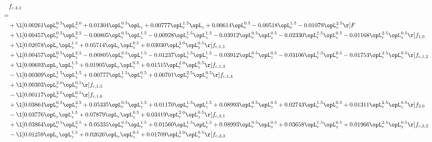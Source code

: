 \begin{alignat}{2} 
\label{eq:f_41_1} 
& f_{c,4,1} \nonumber \\ 
 = \\ 
& + \l[  0.00261 \opL_r^{0.5} \opL_z^{2.0} +  0.01304 \opL_r^{0.5} \opL_z +  0.00777 \opL_r^{1.5} \opL_z +  0.00614 \opL_r^{0.5}   -0.00518 \opL_r^{1.5}   -0.01079 \opL_r^{2.5}  \r] F \nonumber \\ 
& + \l[  0.00457 \opL_r^{0.5} \opL_z^{2.5}   -0.00805 \opL_r^{0.5} \opL_z^{1.5}   -0.00928 \opL_r^{1.5} \opL_z^{1.5}   -0.03912 \opL_r^{0.5} \opL_z^{0.5}   -0.02330 \opL_r^{1.5} \opL_z^{0.5}   -0.01168 \opL_r^{2.5} \opL_z^{0.5}  \r] f_{1,0} \nonumber \\ 
& + \l[  0.02078 \opL_r \opL_z^{1.5} +  0.05714 \opL_r \opL_z^{0.5} +  0.03030 \opL_r^{2.0} \opL_z^{0.5}  \r] f_{c,1,1} \nonumber \\ 
& + \l[  0.00457 \opL_r^{0.5} \opL_z^{2.5}   -0.00805 \opL_r^{0.5} \opL_z^{1.5}   -0.01237 \opL_r^{1.5} \opL_z^{1.5}   -0.03912 \opL_r^{0.5} \opL_z^{0.5}   -0.03106 \opL_r^{1.5} \opL_z^{0.5}   -0.01753 \opL_r^{2.5} \opL_z^{0.5}  \r] f_{c,1,2} \nonumber \\ 
& + \l[  0.00693 \opL_r \opL_z^{1.5} +  0.01905 \opL_r \opL_z^{0.5} +  0.01515 \opL_r^{2.0} \opL_z^{0.5}  \r] f_{c,1,3} \nonumber \\ 
& - \l[  0.00309 \opL_r^{1.5} \opL_z^{1.5} +  0.00777 \opL_r^{1.5} \opL_z^{0.5} +  0.00701 \opL_r^{2.5} \opL_z^{0.5}  \r] f_{c,1,4} \nonumber \\ 
& + \l[  0.00303 \opL_r^{2.0} \opL_z^{0.5}  \r] f_{c,1,5} \nonumber \\ 
& - \l[  0.00117 \opL_r^{2.5} \opL_z^{0.5}  \r] f_{c,1,6} \nonumber \\ 
& + \l[  0.03864 \opL_r^{0.5} \opL_z^{2.5} +  0.05335 \opL_r^{0.5} \opL_z^{1.5} +  0.01170 \opL_r^{1.5} \opL_z^{1.5} +  0.08993 \opL_r^{0.5} \opL_z^{0.5} +  0.02743 \opL_r^{1.5} \opL_z^{0.5} +  0.01311 \opL_r^{2.5} \opL_z^{0.5}  \r] f_{3,0} \nonumber \\ 
& - \l[  0.03776 \opL_r \opL_z^{1.5} +  0.07879 \opL_r \opL_z^{0.5} +  0.03419 \opL_r^{2.0} \opL_z^{0.5}  \r] f_{c,3,1} \nonumber \\ 
& + \l[  0.03864 \opL_r^{0.5} \opL_z^{2.5} +  0.05335 \opL_r^{0.5} \opL_z^{1.5} +  0.01560 \opL_r^{1.5} \opL_z^{1.5} +  0.08993 \opL_r^{0.5} \opL_z^{0.5} +  0.03658 \opL_r^{1.5} \opL_z^{0.5} +  0.01966 \opL_r^{2.5} \opL_z^{0.5}  \r] f_{c,3,2} \nonumber \\ 
& - \l[  0.01259 \opL_r \opL_z^{1.5} +  0.02626 \opL_r \opL_z^{0.5} +  0.01709 \opL_r^{2.0} \opL_z^{0.5}  \r] f_{c,3,3} \nonumber \\ 

\end{alignat}
